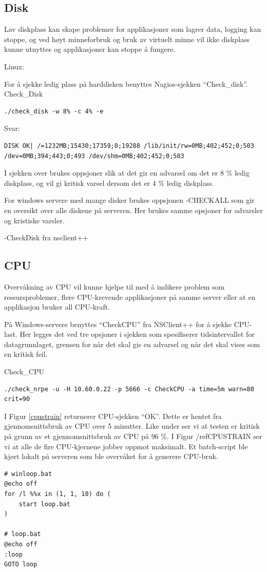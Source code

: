 \subsection{Disk}
Lav diskplass kan skape problemer for applikasjoner som lagrer data, logging kan stoppe, og ved høyt minneforbruk og bruk av virtuelt minne vil ikke diskplass kunne utnyttes og applikasjoner kan stoppe å fungere.

Linux:

For å sjekke ledig plass på harddisken benyttes Nagios-sjekken “Check\_disk”. 
Check\_Disk
\begin{lstlisting}
./check_disk -w 8% -c 4% -e
\end{lstlisting}
Svar: 
\begin{lstlisting}
DISK OK| /=1232MB;15430;17359;0;19288 /lib/init/rw=0MB;402;452;0;503 /dev=0MB;394;443;0;493 /dev/shm=0MB;402;452;0;503
\end{lstlisting}
I sjekken over brukes oppsjoner slik at det gir en advarsel om det er 8 \% ledig diskplass, og vil gi kritisk varsel dersom det er 4 \% ledig diskplass.

For windows servere med mange disker brukes oppsjonen -CHECKALL som gir en oversikt over alle diskene på serveren. Her brukes samme opsjoner for advarsler og kristiske varsler.

-CheckDisk fra nsclient++

\subsection{CPU}

Overvåkning av CPU vil kunne hjelpe til med å indikere problem som ressursproblemer, flere CPU-krevende applikasjoner på samme server eller at en applikasjon bruker all CPU-kraft.  

På Windows-servere benyttes “CheckCPU” fra NSClient++ for å sjekke CPU-last. Her legges det ved tre opsjoner i sjekken som spesifiserer tidsintervallet for datagrunnlaget, grensen for når det skal gis en advarsel og når det skal vises som en kritisk feil.

Check\_CPU
\begin{lstlisting}
./check_nrpe -u -H 10.60.0.22 -p 5666 -c CheckCPU -a time=5m warn=80 crit=90
\end{lstlisting}
I Figur \ref{cpustrain} returnerer CPU-sjekken “OK”. Dette er hentet fra gjennomsnittsbruk av CPU over 5 minutter. Like under ser vi at testen er kritisk på grunn av et gjennomsnittsbruk av CPU på 96 \%. I Figur /ref{CPUSTRAIN} ser vi at alle de fire CPU-kjernene jobber oppmot maksimalt. Et batch-script ble kjørt lokalt på serveren som ble overvåket for å generere CPU-bruk.
\begin{lstlisting}
# winloop.bat
@echo off
for /l %%x in (1, 1, 10) do (
    start loop.bat
)

# loop.bat
@echo off
:loop
GOTO loop
\end{lstlisting}


